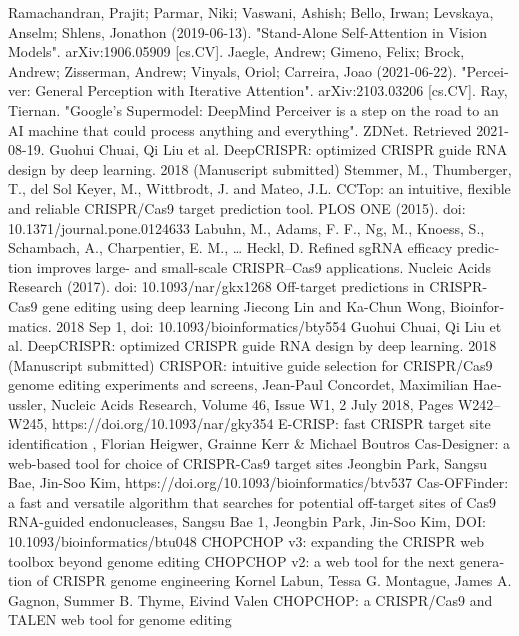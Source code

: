 \documentclass[12pt,a4paper,BCOR=.7cm,headsepline,bibliography=totoc]{report}
\begin{document}
\begin{thebibliography}{1}
\begin{latin}
 {Ramachandran, Prajit; Parmar, Niki; Vaswani, Ashish; Bello, Irwan; Levskaya, Anselm; Shlens, Jonathon (2019-06-13). "Stand-Alone Self-Attention in Vision Models". arXiv:1906.05909 [cs.CV].}
 {Jaegle, Andrew; Gimeno, Felix; Brock, Andrew; Zisserman, Andrew; Vinyals, Oriol; Carreira, Joao (2021-06-22). "Perceiver: General Perception with Iterative Attention". arXiv:2103.03206 [cs.CV].}
 {Ray, Tiernan. "Google's Supermodel: DeepMind Perceiver is a step on the road to an AI machine that could process anything and everything". ZDNet. Retrieved 2021-08-19.}
 {Guohui Chuai, Qi Liu et al. DeepCRISPR: optimized CRISPR guide RNA design by deep learning. 2018 (Manuscript submitted)}
 {Stemmer, M., Thumberger, T., del Sol Keyer, M., Wittbrodt, J. and Mateo, J.L. CCTop: an intuitive, flexible and reliable CRISPR/Cas9 target prediction tool. PLOS ONE (2015). doi: 10.1371/journal.pone.0124633}
 {Labuhn, M., Adams, F. F., Ng, M., Knoess, S., Schambach, A., Charpentier, E. M., … Heckl, D. Refined sgRNA efficacy prediction improves large- and small-scale CRISPR–Cas9 applications. Nucleic Acids Research (2017). doi: 10.1093/nar/gkx1268}
 {Off-target predictions in CRISPR-Cas9 gene editing using deep learning
Jiecong Lin and Ka-Chun Wong, Bioinformatics. 2018 Sep 1, doi: 10.1093/bioinformatics/bty554}
 {Guohui Chuai, Qi Liu et al. DeepCRISPR: optimized CRISPR guide RNA design by deep learning. 2018 (Manuscript submitted)}
 {CRISPOR: intuitive guide selection for CRISPR/Cas9 genome editing experiments and screens, Jean-Paul Concordet, Maximilian Haeussler, Nucleic Acids Research, Volume 46, Issue W1, 2 July 2018, Pages W242–W245, https://doi.org/10.1093/nar/gky354}
 {E-CRISP: fast CRISPR target site identification , Florian Heigwer, Grainne Kerr \& Michael Boutros}
 {Cas-Designer: a web-based tool for choice of CRISPR-Cas9 target sites 
Jeongbin Park, Sangsu Bae, Jin-Soo Kim, https://doi.org/10.1093/bioinformatics/btv537}
 {Cas-OFFinder: a fast and versatile algorithm that searches for potential off-target sites of Cas9 RNA-guided endonucleases, Sangsu Bae 1, Jeongbin Park, Jin-Soo Kim, DOI: 10.1093/bioinformatics/btu048}
 {CHOPCHOP v3: expanding the CRISPR web toolbox beyond genome editing}
 {CHOPCHOP v2: a web tool for the next generation of CRISPR genome engineering 
Kornel Labun, Tessa G. Montague, James A. Gagnon, Summer B. Thyme, Eivind Valen}
 {CHOPCHOP: a CRISPR/Cas9 and TALEN web tool for genome editing}


\end{latin}
\end{thebibliography}
\end{document}
